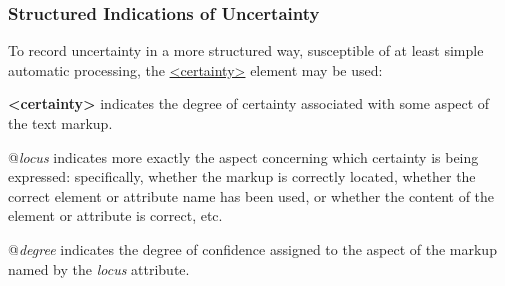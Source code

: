 \subsubsection[{Structured Indications of Uncertainty}]{Structured Indications of Uncertainty}\label{CECECE}\par
To record uncertainty in a more structured way, susceptible of at least simple automatic processing, the \hyperref[TEI.certainty]{<certainty>} element may be used: 
\begin{sansreflist}
  
\item [\textbf{<certainty>}] indicates the degree of certainty associated with some aspect of the text markup.\hfil\\[-10pt]\begin{sansreflist}
    \item[@{\itshape locus}]
  indicates more exactly the aspect concerning which certainty is being expressed: specifically, whether the markup is correctly located, whether the correct element or attribute name has been used, or whether the content of the element or attribute is correct, etc.
    \item[@{\itshape degree}]
  indicates the degree of confidence assigned to the aspect of the markup named by the {\itshape locus} attribute.
\end{sansreflist}  
\end{sansreflist}
\par

